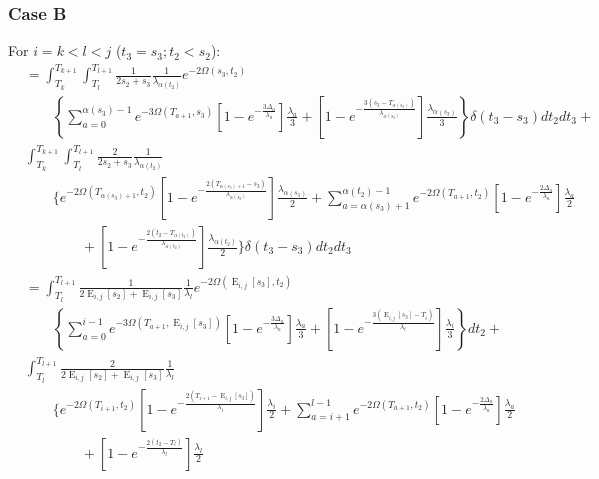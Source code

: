 \documentclass{article}
\DeclareMathOperator{\E}{E}
\begin{document}
\subsubsection{Case B}
For $i=k<l<j$ ($t_3=s_3; t_2<s_2$): %
\begin{align*}
    &=\int_{T_k}^{T_{k+1}}\int_{T_l}^{T_{l+1}}\frac{1}{2s_2+s_3}\frac{1}{\lambda_{\alpha(t_2)}}e^{-2\Omega(s_3,t_2)}\\
    &\qquad\left\{\sum_{a=0}^{\alpha(s_3)-1}e^{-3\Omega(T_{a+1},s_3)}
        \left[1-e^{-\frac{3\Delta_a}{\lambda_a}}\right]\frac{\lambda_a}{3}+
    \left[1-e^{-\frac{3\left(s_3-T_{\alpha(s_3)}\right)}{\lambda_{\alpha(s_3)}}}\right]
        \frac{\lambda_{\alpha(s_3)}}{3}\right\}\delta(t_3-s_3)dt_2dt_3+\\
        &\int_{T_k}^{T_{k+1}}\int_{T_l}^{T_{l+1}}\frac{2}{2s_2+s_3}\frac{1}{\lambda_{\alpha(t_2)}}\\
    &\qquad\Bigg\{e^{-2\Omega(T_{\alpha(s_3)+1},t_2)}\left[1-e^{-\frac{2\left(T_{\alpha(s_3)+1}-s_3\right)}{\lambda_{\alpha(s_3)}}}\right]\frac{\lambda_{\alpha(s_3)}}{2}+\sum_{a=\alpha(s_3)+1}^{\alpha(t_2)-1}e^{-2\Omega\left(T_{a+1},t_2\right)}\left[1-e^{-\frac{2\Delta_a}{\lambda_a}}\right]\frac{\lambda_a}{2}\\
    &\qquad\qquad+\left[1-e^{-\frac{2\left(t_2-T_{\alpha(t_2)}\right)}{\lambda_{\alpha(t_2)}}}\right]\frac{\lambda_{\alpha(t_2)}}{2}
    \Bigg\}\delta(t_3-s_3)dt_2dt_3\\[2em]
    &=\int_{T_l}^{T_{l+1}}\frac{1}{2\E_{i,j}[s_2]+\E_{i,j}[s_3]}\frac{1}{\lambda_l}e^{-2\Omega(\E_{i,j}[s_3],t_2)}\\
    &\qquad\left\{\sum_{a=0}^{i-1}e^{-3\Omega(T_{a+1},\E_{i,j}[s_3])}
        \left[1-e^{-\frac{3\Delta_a}{\lambda_a}}\right]\frac{\lambda_a}{3}+
    \left[1-e^{-\frac{3\left(\E_{i,j}[s_3]-T_{i}\right)}{\lambda_{i}}}\right]
        \frac{\lambda_{i}}{3}\right\}dt_2+\\
        &\int_{T_l}^{T_{l+1}}\frac{2}{2\E_{i,j}[s_2]+\E_{i,j}[s_3]}\frac{1}{\lambda_{l}}\\
    &\qquad\Bigg\{e^{-2\Omega(T_{i+1},t_2)}\left[1-e^{-\frac{2\left(T_{i+1}-\E_{i,j}[s_3]\right)}{\lambda_{i}}}\right]\frac{\lambda_{i}}{2}+\sum_{a=i+1}^{l-1}e^{-2\Omega\left(T_{a+1},t_2\right)}\left[1-e^{-\frac{2\Delta_a}{\lambda_a}}\right]\frac{\lambda_a}{2}\\
    &\qquad\qquad+\left[1-e^{-\frac{2\left(t_2-T_{l}\right)}{\lambda_{l}}}\right]\frac{\lambda_{l}}{2}

\end{align*}
\end{document}

